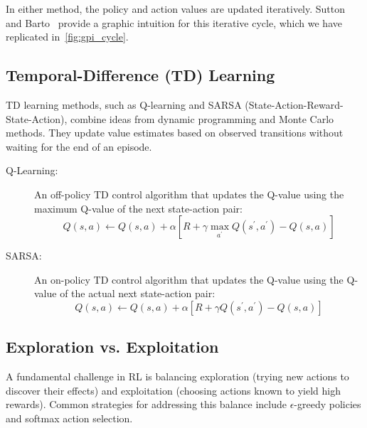 In either method, the policy and action values are updated iteratively.
Sutton and Barto~\cite{sutton2018} provide a graphic intuition for this 
iterative cycle, which we have replicated in~\cref{fig:gpi_cycle}.








\subsection*{Temporal-Difference (TD) Learning}%
TD learning methods, such as Q-learning and SARSA (State-Action-Reward-State-Action), 
combine ideas from dynamic programming and Monte Carlo methods. They update 
value estimates based on observed transitions without waiting for the end of an episode.
\begin{description}
    \item[Q-Learning:] An off-policy TD control algorithm that updates the Q-value using the 
        maximum Q-value of the next state-action pair:
        \begin{equation}
            Q(s, a) \leftarrow Q(s, a) 
            + \alpha \left[ R + \gamma \max_{a^\prime} Q(s^\prime, a^\prime) - Q(s, a) \right]
        \end{equation}
    \item[SARSA:] An on-policy TD control algorithm that updates the Q-value using the Q-value of 
        the actual next state-action pair:
        \begin{equation}
            Q(s, a) \leftarrow Q(s, a) 
            + \alpha \left[ R + \gamma Q(s^\prime, a^\prime) - Q(s, a) \right]
        \end{equation}
\end{description}

\subsection*{Exploration vs. Exploitation}
A fundamental challenge in RL is balancing exploration (trying new actions to discover their 
effects) and exploitation (choosing actions known to yield high rewards). 
Common strategies for addressing this balance include \(\epsilon\)-greedy policies and 
softmax action selection.

